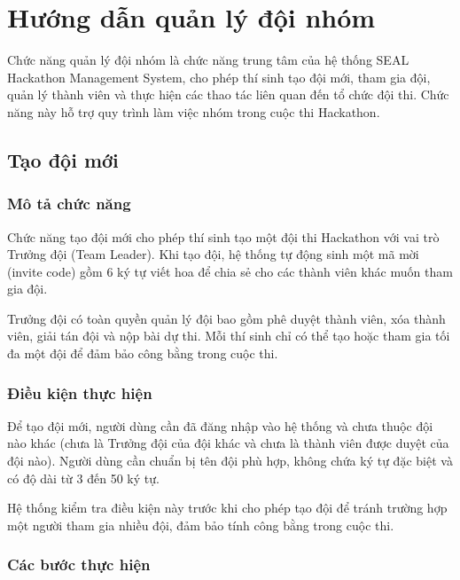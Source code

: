 
\section{Hướng dẫn quản lý đội nhóm}

Chức năng quản lý đội nhóm là chức năng trung tâm của hệ thống SEAL Hackathon Management System, cho phép thí sinh tạo đội mới, tham gia đội, quản lý thành viên và thực hiện các thao tác liên quan đến tổ chức đội thi. Chức năng này hỗ trợ quy trình làm việc nhóm trong cuộc thi Hackathon.

\subsection{Tạo đội mới}

\subsubsection{Mô tả chức năng}

Chức năng tạo đội mới cho phép thí sinh tạo một đội thi Hackathon với vai trò Trưởng đội (Team Leader). Khi tạo đội, hệ thống tự động sinh một mã mời (invite code) gồm 6 ký tự viết hoa để chia sẻ cho các thành viên khác muốn tham gia đội.

Trưởng đội có toàn quyền quản lý đội bao gồm phê duyệt thành viên, xóa thành viên, giải tán đội và nộp bài dự thi. Mỗi thí sinh chỉ có thể tạo hoặc tham gia tối đa một đội để đảm bảo công bằng trong cuộc thi.

\subsubsection{Điều kiện thực hiện}

Để tạo đội mới, người dùng cần đã đăng nhập vào hệ thống và chưa thuộc đội nào khác (chưa là Trưởng đội của đội khác và chưa là thành viên được duyệt của đội nào). Người dùng cần chuẩn bị tên đội phù hợp, không chứa ký tự đặc biệt và có độ dài từ 3 đến 50 ký tự.

Hệ thống kiểm tra điều kiện này trước khi cho phép tạo đội để tránh trường hợp một người tham gia nhiều đội, đảm bảo tính công bằng trong cuộc thi.

\subsubsection{Các bước thực hiện}

